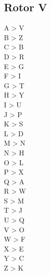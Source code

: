 \begin{multicols}{2}
\subsection{Rotor V}
A > V\\
B > Z\\
C > B\\
D > R\\
E > G\\
F > I\\
G > T\\
H > Y\\
I > U\\
J > P\\
K > S\\
L > D\\
M > N\\
N > H\\
O > L\\
P > X\\
Q > A\\
R > W\\
S > M\\
T > J\\
U > Q\\
V > O\\
W > F\\
X > E\\
Y > C\\
Z > K\\
\end{multicols}